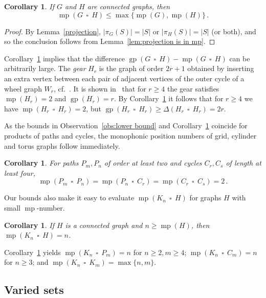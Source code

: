\documentclass[12pt]{article}
\newtheorem{corollary}[theorem]{Corollary}
\DeclareMathOperator {\gp} {gp}
\DeclareMathOperator {\mono} {mp}
\DeclareMathOperator{\cp}{\,\square\,}
\begin{document}
\begin{corollary}\label{cor:upper bound}
If $G$ and $H$ are connected graphs, then 
$$\mono (G \cp H) \leq \max \{ \mono (G), \mono (H)\}\,.$$
\end{corollary}

\begin{proof}
By Lemma~\ref{projection}, $|\pi _G(S)| = |S|$ or $|\pi _H(S)| = |S|$ (or both), and so the conclusion follows from Lemma~\ref{lem:projection is in mp}.
\end{proof}

Corollary~\ref{cor:upper bound} implies that the difference $\gp (G \cp H)- \mono (G \cp H)$ can be arbitrarily large. The \emph{gear} $H_r$ is the graph of order $2r+1$ obtained by inserting an extra vertex between each pair of adjacent vertices of the outer cycle of a wheel graph $W_r$, cf.~\cite{peabody-2013}. It is shown in~\cite{Thomas-2024b} that for $r \geq 4$ the gear satisfies $\mono (H_r) = 2$ and $\gp (H_r) = r$. By Corollary~\ref{cor:upper bound} it follows that for $r \geq 4$ we have $\mono (H_r \cp H_r) = 2$, but $\gp (H_r \cp H_r) \geq \Delta (H_r \cp H_r) = 2r$.

As the bounds in Observation~\ref{obs:lower bound} and Corollary~\ref{cor:upper bound} coincide for products of paths and cycles, the monophonic position numbers of grid, cylinder and torus graphs follow immediately.

\begin{corollary}
For paths $P_m,P_n$ of order at least two and cycles $C_r,C_s$ of length at least four, 
\[ \mono (P_m \cp P_n) = \mono (P_n \cp C_r) = \mono (C_r \cp C_s) = 2\,.\]
\end{corollary}

Our bounds also make it easy to evaluate $\mono (K_n \cp H)$ for graphs $H$ with small $\mono $-number.

\begin{corollary}\label{cor:cliques,paths,cycles}
If $H$ is a connected graph and $n \geq \mono (H)$, then $\mono (K_n \cp H) = n$. 
\end{corollary}

Corollary~\ref{cor:cliques,paths,cycles} yields $\mono (K_n \cp P_m) = n$ for $n \geq 2,m \geq 4$; $\mono (K_n \cp C_m) = n$ for $n \geq 3$; and $\mono (K_n \cp K_m) = \max\{ n,m\} $. 


\subsection{Varied sets}
\end{document}
